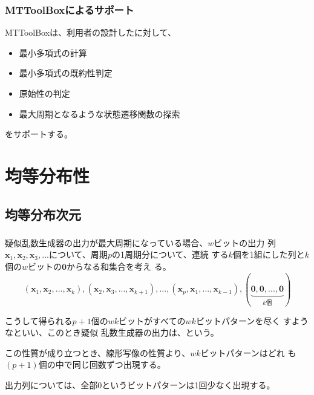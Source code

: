 \documentclass[cjk, dvips, xcolor=dvipsnames, hyperref={bookmarks=false}]{beamer}
\def\bx{{{\mathbf x}}}
\begin{document}
\begin{frame}[t]
  \frametitle{MTToolBoxによるサポート}
  MTToolBoxは、利用者の設計した\FLPRNG に対して、
  \begin{itemize}
  \item 最小多項式の計算
  \item 最小多項式の既約性判定
  \item 原始性の判定
  \item 最大周期となるような状態遷移関数の探索
  \end{itemize}
  をサポートする。
\end{frame}

\section{均等分布性}
\subsection{均等分布次元}
\begin{frame}[t]
  \frametitle{\insertsubsection}

  疑似乱数生成器の出力が最大周期になっている場合、$w$ビットの出力
  列$\bx_1, \bx_2, \bx_3, ...$について、周期$p$の1周期分について、連続
  する$k$個を1組にした列と$k$個の$w$ビットの$\mathbf{0}$からなる和集合を考え
  る。
  \[
  (\bx_1, \bx_2, ..., \bx_k), (\bx_2, \bx_3, ..., \bx_{k+1}), ...,
  (\bx_{p}, \bx_{1}, ..., \bx_{k-1}), (\underbrace{\mathbf{0},
    \mathbf{0}, ..., \mathbf{0}}_{k\text{個}})
  \]

  \pause
  こうして得られる$p+1$個の$wk$ビットがすべての$wk$ビットパターンを尽く
  すようなといい、このとき疑似
  乱数生成器の出力は、という。

  \pause
  \vspace{\baselineskip}
  この性質が成り立つとき、線形写像の性質より、$wk$ビットパターンはどれ
  も$(p+1)$個の中で同じ回数ずつ出現する。

  出力列については、全部$0$というビットパターンは1回少なく出現する。
\end{frame}
\end{document}
